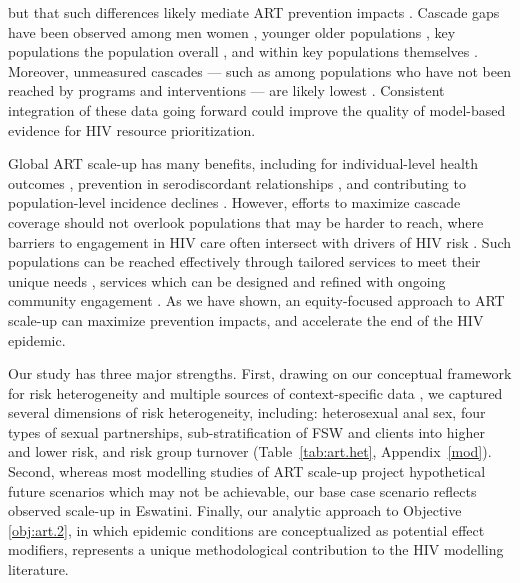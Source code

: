 but that such differences likely mediate ART prevention impacts \cite{Knight2022sr}.
Cascade gaps have been observed among men \vs women \cite{Quinn2019,Green2020},
younger \vs older populations \cite{Green2020,Lebelonyane2021},
key populations \vs the population overall \cite{Hakim2018},
and within key populations themselves \cite{Mayanja2018,Jaffer2022}.
Moreover, unmeasured cascades
--- such as among populations who have not been reached by programs and interventions ---
are likely lowest \cite{Hakim2018,Boothe2021}.
Consistent integration of these data going forward could
improve the quality of model-based evidence for HIV resource prioritization.
\par
Global ART scale-up has many benefits, including for
individual-level health outcomes \cite{Gabillard2013,Lundgren2015init},
prevention in serodiscordant relationships \cite{Cohen2016},
and contributing to population-level incidence declines \cite{Havlir2020}.
However, efforts to maximize cascade coverage should not overlook
populations that may be harder to reach,
where barriers to engagement in HIV care often intersect with drivers of HIV risk
\cite{Wanyenze2016,Schwartz2017,Schmidt-Sane2022,Camlin2019,Baral2019}.
Such populations can be reached effectively through
tailored services to meet their unique needs \cite{Ehrenkranz2019},
services which can be designed and refined with ongoing community engagement
\cite{Chikwari2018,Mlambo2019,Comins2022}.
As we have shown, an equity-focused approach to ART scale-up can maximize prevention impacts,
and accelerate the end of the HIV epidemic.
\par
Our study has three major strengths.
First, drawing on our conceptual framework for risk heterogeneity \cite[Table~1]{Knight2022sr}
and multiple sources of context-specific data
\cite{SDHS2006,SHIMS1,SHIMS2,Baral2014,EswKP2014,EswIBBS2022},
we captured several dimensions of risk heterogeneity, including:
heterosexual anal sex,
four types of sexual partnerships,
sub-stratification of FSW and clients into higher and lower risk,
and risk group turnover
(Table~\ref{tab:art.het}, Appendix~\ref{mod}).
Second, whereas most modelling studies of ART scale-up
project hypothetical future scenarios which may not be achievable,
our base case scenario reflects observed scale-up in Eswatini.
Finally, our analytic approach to Objective \ref{obj:art.2},
in which epidemic conditions are conceptualized as potential effect modifiers,
represents a unique methodological contribution to the HIV modelling literature.
\par
